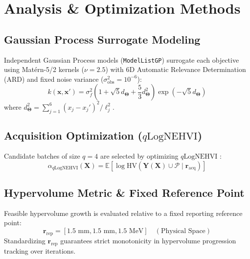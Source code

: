 \documentclass[11pt,a4paper]{article}
\begin{document}
\section{Analysis \& Optimization Methods}
\label{sec:methods}

\subsection{Gaussian Process Surrogate Modeling}
Independent Gaussian Process models (\texttt{ModelListGP}) surrogate each objective using Mat\'{e}rn-5/2 kernels ($\nu = 2.5$) with 6D Automatic Relevance Determination (ARD) and fixed noise variance ($\sigma_{\text{obs}}^2 = 10^{-6}$):
\begin{equation}
    k(\mathbf{x}, \mathbf{x}') = \sigma_f^2 \left( 1 + \sqrt{5} d_{\mathbf{\Theta}} + \frac{5}{3} d_{\mathbf{\Theta}}^2 \right) \exp\left(-\sqrt{5} d_{\mathbf{\Theta}}\right)
\end{equation}
where $d_{\mathbf{\Theta}}^2 = \sum_{j=1}^6 (x_j - x_j')^2 / \ell_j^2$.

\subsection{Acquisition Optimization ($q\text{LogNEHVI}$)}
Candidate batches of size $q=4$ are selected by optimizing $q\text{LogNEHVI}$ \cite{Daulton2021qNEHVI}:
\begin{equation}
    \alpha_{q\text{LogNEHVI}}(\mathbf{X}) = \mathbb{E} \left[ \log \text{HV}\left( \mathbf{Y}(\mathbf{X}) \cup \mathcal{P} \mid \mathbf{r}_{\text{acq}} \right) \right]
\end{equation}

\subsection{Hypervolume Metric \& Fixed Reference Point}
Feasible hypervolume growth is evaluated relative to a fixed reporting reference point:
\begin{equation}
    \mathbf{r}_{\text{rep}} = [1.5\text{ mm}, 1.5\text{ mm}, 1.5\text{ MeV}] \quad (\text{Physical Space})
\end{equation}
Standardizing $\mathbf{r}_{\text{rep}}$ guarantees strict monotonicity in hypervolume progression tracking over iterations.
\end{document}
